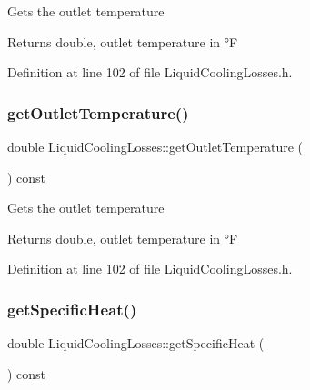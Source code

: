 Gets the outlet temperature \begin{DoxyReturn}{Returns}
double, outlet temperature in °F 
\end{DoxyReturn}


Definition at line 102 of file Liquid\+Cooling\+Losses.\+h.

\mbox{\label{class_liquid_cooling_losses_ae6364da9b374e95dd657096350464acb}} 
\subsubsection{\texorpdfstring{get\+Outlet\+Temperature()}{getOutletTemperature()}\hspace{0.1cm}{\footnotesize\ttfamily [3/3]}}
{\footnotesize\ttfamily double Liquid\+Cooling\+Losses\+::get\+Outlet\+Temperature (\begin{DoxyParamCaption}{ }\end{DoxyParamCaption}) const\hspace{0.3cm}{\ttfamily [inline]}}

Gets the outlet temperature \begin{DoxyReturn}{Returns}
double, outlet temperature in °F 
\end{DoxyReturn}


Definition at line 102 of file Liquid\+Cooling\+Losses.\+h.

\mbox{\label{class_liquid_cooling_losses_aa60623b6f1fab605d25c9c24e8dd00ec}} 
\subsubsection{\texorpdfstring{get\+Specific\+Heat()}{getSpecificHeat()}\hspace{0.1cm}{\footnotesize\ttfamily [1/3]}}
{\footnotesize\ttfamily double Liquid\+Cooling\+Losses\+::get\+Specific\+Heat (\begin{DoxyParamCaption}{ }\end{DoxyParamCaption}) const\hspace{0.3cm}{\ttfamily [inline]}}

